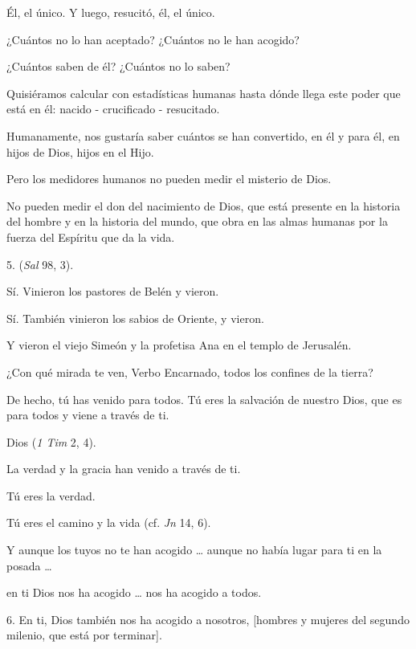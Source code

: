 \begin{body}
							Él, el único. Y luego, resucitó, él, el único.
							
							¿Cuántos no lo han aceptado? ¿Cuántos no le han acogido?
							
							¿Cuántos saben de él? ¿Cuántos no lo saben?
							
							Quisiéramos calcular con estadísticas humanas hasta dónde llega este poder que está en él: nacido - crucificado - resucitado.
							
							Humanamente, nos gustaría saber cuántos se han convertido, en él y para él, en hijos de Dios, hijos en el Hijo.
							
							Pero los medidores humanos no pueden medir el misterio de Dios.
							
							No pueden medir el don del nacimiento de Dios, que está presente en la historia del hombre y en la historia del mundo, que obra en las almas humanas por la fuerza del Espíritu que da la vida.
							
							5.  (\emph{Sal} 98, 3).
							
							Sí. Vinieron los pastores de Belén y vieron.
							
							Sí. También vinieron los sabios de Oriente, y vieron.
							
							Y vieron el viejo Simeón y la profetisa Ana en el templo de Jerusalén.
							
							¿Con qué mirada te ven, Verbo Encarnado, todos los confines de la tierra?
							
							De hecho, tú has venido para todos. Tú eres la salvación de nuestro Dios, que es para todos y viene a través de ti.
							
							Dios  (\emph{1 Tim} 2, 4).
							
							La verdad y la gracia han venido a través de ti.
							
							Tú eres la verdad.
							
							Tú eres el camino y la vida (cf. \emph{Jn} 14, 6).
							
							Y aunque los tuyos no te han acogido \ldots{} aunque no había lugar para ti en la posada \ldots{}
							
							en ti Dios nos ha acogido \ldots{} nos ha acogido a todos.
							
							6. En ti, Dios también nos ha acogido a nosotros, {[}hombres y mujeres del segundo milenio, que está por terminar{]}.
							

\end{body}
